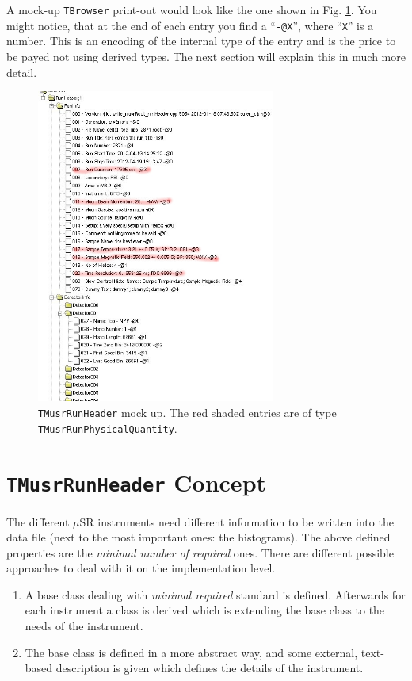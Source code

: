 \documentclass[twoside]{article}
\newcommand{\musr}{$\mu$SR\xspace}
\newcommand{\tmrh}{\texttt{TMusrRunHeader}\xspace}
\begin{document}
\noindent A mock-up \texttt{TBrowser} print-out would look like the one shown in Fig. \ref{fig:MusrRootRunHeaderCartoon}. You might notice, that at the end of each entry you find a ``\verb!-@X!'', where ``\verb!X!'' is a number. This is an encoding of the internal type of the entry and is the price to be payed not using derived types. The next section will explain this in much more detail.

\begin{figure}[h]
 \centering
 \includegraphics[width=0.7\textwidth]{MusrRootRunHeaderCartoon}
 \caption{\tmrh mock up. The red shaded entries are of type \texttt{TMusrRunPhysicalQuantity}.}\label{fig:MusrRootRunHeaderCartoon}
\end{figure}

\clearpage

\section{\tmrh Concept}\label{sec:tmrh_Concept}

The different \musr instruments need different information to be written into the data file (next to the most important ones: the histograms). The above defined properties are the \emph{minimal number of required} ones. There are different possible approaches to deal with it on the implementation level.

\begin{enumerate}
 \item A base class dealing with \emph{minimal required} standard is defined. Afterwards for each instrument a class is derived which is extending the base class to the needs of the instrument.
 \item The base class is defined in a more abstract way, and some external, text-based description is given which defines the details of the instrument.
\end{enumerate}
\end{document}
